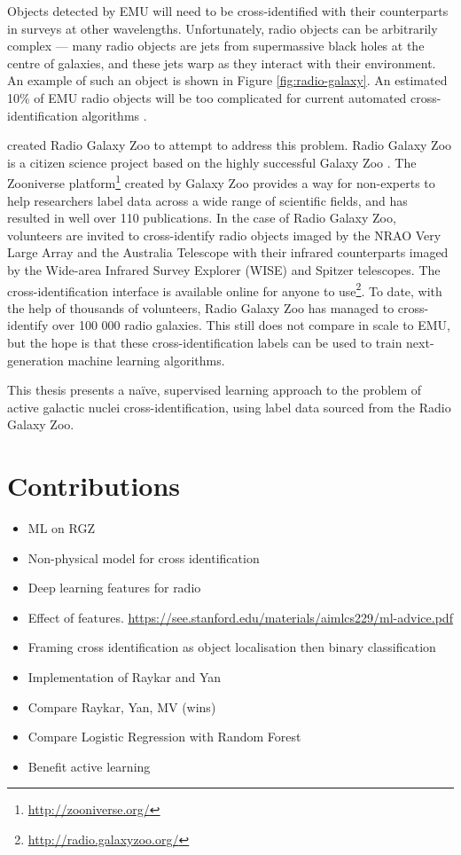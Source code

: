 Objects detected by EMU will need to be cross-identified with their counterparts
in surveys at other wavelengths. Unfortunately, radio objects can be arbitrarily
complex --- many radio objects are jets from supermassive black holes at the
centre of galaxies, and these jets warp as they interact with their environment.
An example of such an object is shown in Figure \ref{fig:radio-galaxy}. An
estimated 10\% of EMU radio objects will be too complicated for current
automated cross-identification algorithms \citep{banfield15, norris11}.

\citet{banfield15} created Radio Galaxy Zoo to attempt to address this
problem. Radio Galaxy Zoo is a citizen science project based on the highly
successful Galaxy Zoo \citep{lintott08, lintott11}. The Zooniverse
platform\footnote{\url{http://zooniverse.org/}} created by Galaxy Zoo provides a
way for non-experts to help researchers label data across a wide range of
scientific fields, and has resulted in well over 110 publications. In the case
of Radio Galaxy Zoo, volunteers are invited to cross-identify radio objects
imaged by the NRAO Very Large Array and the Australia Telescope with their
infrared counterparts imaged by the Wide-area Infrared Survey Explorer (WISE)
and Spitzer telescopes. The cross-identification interface is available online
for anyone to use\footnote{\url{http://radio.galaxyzoo.org/}}. To date, with the
help of thousands of volunteers, Radio Galaxy Zoo has managed to cross-identify
over 100 000 radio galaxies. This still does not compare in scale to EMU, but
the hope is that these cross-identification labels can be used to train
next-generation machine learning algorithms.

This thesis presents a na\"ive, supervised learning approach to the problem of
active galactic nuclei cross-identification, using label data sourced from the
Radio Galaxy Zoo.

\section{Contributions}
\label{sec:contributions}

  \begin{itemize}
    \item ML on RGZ
    \item Non-physical model for cross identification
    \item Deep learning features for radio
    \item Effect of features. \url{https://see.stanford.edu/materials/aimlcs229/ml-advice.pdf}
    \item Framing cross identification as object localisation then binary classification
    \item Implementation of Raykar and Yan
    \item Compare Raykar, Yan, MV (wins)
    \item Compare Logistic Regression with Random Forest
    \item Benefit active learning
  \end{itemize}

